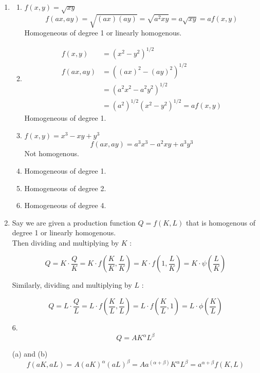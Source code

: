 \documentclass{./../../Latex/homework}
\begin{document}
\begin{enumerate}
\item 
\begin{enumerate}
\item $f(x, y)=\sqrt{x y}$
$$
f(a x, a y)=\sqrt{(a x)(a y)}=\sqrt{a^{2} x y}=a \sqrt{x y}=a f(x, y)
$$
Homogeneous of degree 1 or linearly homogenous. 

\item
$$
\begin{aligned}
f(x, y) &=\left(x^{2}-y^{2}\right)^{1 / 2} \\
f(a x, a y) &=\left((a x)^{2}-(a y)^{2}\right)^{1 / 2} \\
&=\left(a^{2} x^{2}-a^{2} y^{2}\right)^{1 / 2} \\
&=\left(a^{2}\right)^{1 / 2}\left(x^{2}-y^{2}\right)^{1 / 2}=a f(x, y)
\end{aligned}
$$
Homogeneous of degree 1. 

\item $f(x, y)=x^{3}-x y+y^{3}$
$$
f(a x, a y)=a^{3} x^{3}-a^{2} x y+a^{3} y^{3}
$$
Not homogenous. 

\item Homogeneous of degree 1.
\item Homogeneous of degree 2.
\item Homogeneous of degree 4. 
\end{enumerate}

\item Say we are given a production function $Q=f(K, L)$ that is homogenous of degree 1 or linearly homogenous. \\

Then dividing and multiplying by $K$ :

$$
Q=K \cdot \frac{Q}{K}=K \cdot f\left(\frac{K}{K}, \frac{L}{K}\right)=K \cdot f\left(1, \frac{L}{K}\right)=K \cdot \psi\left(\frac{L}{K}\right)
$$

Similarly, dividing and multiplying by $L$ :

$$
Q=L \cdot \frac{Q}{L}=L \cdot f\left(\frac{K}{L}, \frac{L}{L}\right)=L \cdot f\left(\frac{K}{L}, 1\right)=L \cdot \phi\left(\frac{K}{L}\right)
$$

\vspace{1em}

\item[6.] $$Q=A K^{\alpha} L^{\beta}$$


(a) and (b) $$ f(a K, a L)=A(a K)^{\alpha}(a L)^{\beta}=A a^{(\alpha+\beta)} K^{\alpha} L^ \beta=a^{\alpha+\beta} f(K, L)$$


\end{enumerate}
\end{document}
